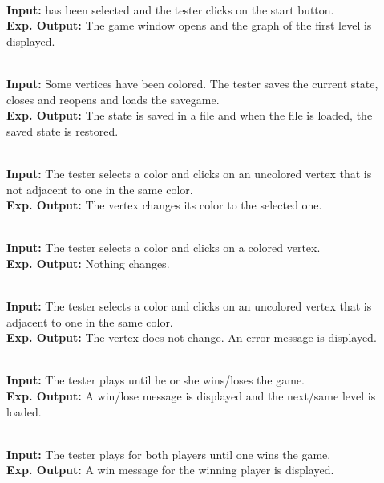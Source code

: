 \begin{description}
	\item[] \textbf{} \\
	\textbf{Input:} \graphcoloring has been selected and the tester clicks on the start button. \\
	\textbf{Exp. Output:} The game window opens and the graph of the first level is displayed.
	
	\item[] \textbf{} \\
	\textbf{Input:} Some vertices have been colored. The tester saves the current state, closes and reopens \graphcoloring and loads the savegame. \\
	\textbf{Exp. Output:} The state is saved in a file and when the file is loaded, the saved state is restored.
	
	\item[] \textbf{} \\
	\textbf{Input:} The tester selects a color and clicks on an uncolored vertex that is not adjacent to one in the same color. \\
	\textbf{Exp. Output:} The vertex changes its color to the selected one.
	
	\item[] \textbf{} \\
	\textbf{Input:} The tester selects a color and clicks on a colored vertex. \\
	\textbf{Exp. Output:} Nothing changes.
	
	\item[] \textbf{} \\
	\textbf{Input:} The tester selects a color and clicks on an uncolored vertex that is adjacent to one in the same color. \\
	\textbf{Exp. Output:} The vertex does not change. An error message is displayed.
	
	\item[] \textbf{} \\
	\textbf{Input:} The tester plays until he or she wins/loses the game. \\
	\textbf{Exp. Output:} A win/lose message is displayed and the next/same level is loaded.

	\item[] \textbf{} \\
	\textbf{Input:} The tester plays for both players until one wins the game. \\
	\textbf{Exp. Output:} A win message for the winning player is displayed.
	
\end{description}

